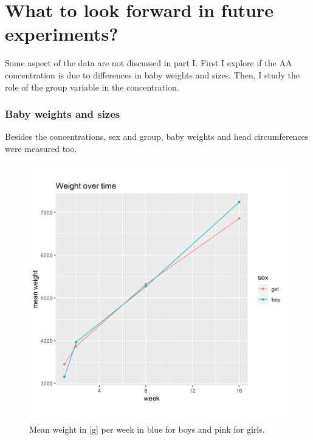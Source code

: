 \documentclass[12pt]{article}
\begin{document}
\clearpage

\part{What to look forward in future experiments?}

Some aspect of the data are not discussed in part I. First I explore if the AA concentration is due to differences in baby weights and sizes. Then, I study the role of the group variable in the concentration.


\section{Baby weights and sizes}

Besides the concentrations, sex and group, baby weights and head circumferences were measured too.

\begin{figure}[!htb]
  \centering
  \includegraphics[width=\textwidth]{../wANDhc/weight.png}
  \caption{Mean weight in [g] per week in blue for boys and pink for girls.}
  \label{fig:weight}
\end{figure}
\end{document}
